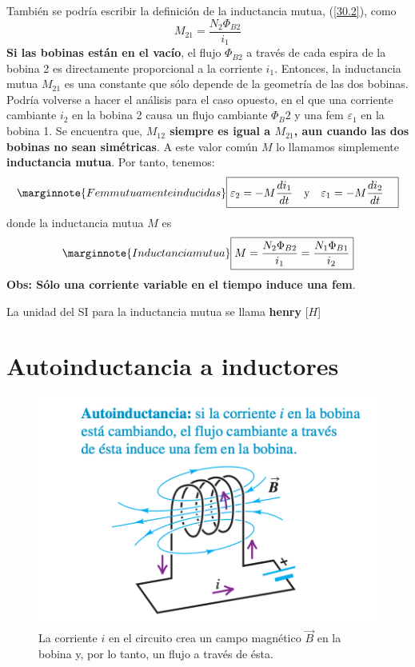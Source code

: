 También se podría escribir la definición de la inductancia mutua, (\ref{30.2}), como
\begin{equation}
M_{21}=\frac{N_2\Phi_{B2}}{i_1}
\end{equation}
\textbf{Si las bobinas están en el vacío}, el flujo $\Phi_{B2}$ a través de cada espira de la bobina 2 es directamente proporcional a la corriente $i_1$. Entonces, la inductancia mutua $M_{21}$ es una constante que sólo depende de la geometría de las dos bobinas.
Podría volverse a hacer el análisis para el caso opuesto, en el que una corriente cambiante $i_2$ en la bobina 2 causa un flujo cambiante $\Phi_{B}2$ y una fem $\varepsilon_1$ en la bobina 1. Se encuentra que, \textbf{$M_{12}$ siempre es igual a $M_{21}$, aun cuando las dos bobinas no sean simétricas}. A este valor común $M$ lo llamamos simplemente \textbf{inductancia mutua}. Por tanto, tenemos:
\begin{equation}\marginnote{Fem mutuamente inducidas}
\boxed{\varepsilon_2=-M\frac{di_1}{dt}\quad\mathrm{y}\quad \varepsilon_1=-M\frac{di_2}{dt}\quad}
\end{equation}
donde la inductancia mutua $M$ es
\begin{equation}\marginnote{Inductancia mutua}
\boxed{M=\frac{N_2\Phi_{B2}}{i_1}=\frac{N_1\Phi_{B1}}{i_2}}
\end{equation}
\textbf{Obs: Sólo una corriente variable en el tiempo induce una fem}.

La unidad del SI para la inductancia mutua se llama \textbf{henry} [$H$]
\section{Autoinductancia a inductores}
\begin{figure}[h]
\centering
\includegraphics[scale=0.4]{fig/autoinductancia}
\caption{La corriente $i$ en el circuito crea un campo magnético $\vec{B}$ en la bobina y, por lo tanto, un flujo a través de ésta.}
\label{fig:autoinductancia}
\end{figure}

